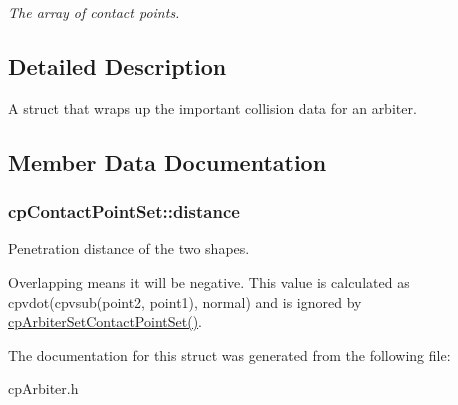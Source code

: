 \begin{DoxyCompactItemize}
\begin{tabbing}
\end{tabbing}\begin{DoxyCompactList}\small\item\em The array of contact points. \end{DoxyCompactList}\end{DoxyCompactItemize}


\subsection{Detailed Description}
A struct that wraps up the important collision data for an arbiter. 

\subsection{Member Data Documentation}
\hypertarget{structcp_contact_point_set_ad8581bff488e9f44ef899f75e044bc6c}{}
\subsubsection[{distance}]{ cp\+Contact\+Point\+Set\+::distance}\label{structcp_contact_point_set_ad8581bff488e9f44ef899f75e044bc6c}


Penetration distance of the two shapes. 

Overlapping means it will be negative. This value is calculated as cpvdot(cpvsub(point2, point1), normal) and is ignored by \hyperlink{group__cp_arbiter_ga42b070a1444350ee824bd2c770366435}{cp\+Arbiter\+Set\+Contact\+Point\+Set()}. 

The documentation for this struct was generated from the following file\+:\begin{DoxyCompactItemize}
\item 
cp\+Arbiter.\+h\end{DoxyCompactItemize}
